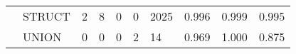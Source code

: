 \begin{table}
\begin{tabular}{lp{1.33cm}p{1.33cm}p{1.33cm}p{1.33cm}p{1.33cm}p{1.33cm}p{1.33cm}p{1.33cm}p{1.33cm}}
      & STRUCT &                                                  2 &                                                8 &                                               0 &                                                0 &                                           2025 &                                    0.996 &                                              0.999 &                                              0.995 \\
      & UNION &                                                  0 &                                                0 &                                               0 &                                                2 &                                             14 &                                    0.969 &                                              1.000 &                                              0.875 \\
\bottomrule
\end{tabular}
\end{table}
